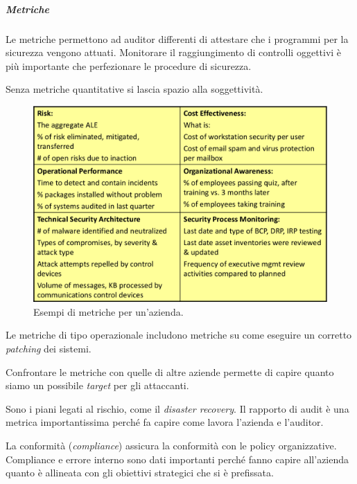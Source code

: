 \subparagraph{Metriche}

Le metriche permettono ad auditor differenti di attestare che i programmi per 
la sicurezza vengono attuati. Monitorare il raggiungimento di controlli oggettivi 
è più importante che perfezionare le procedure di sicurezza.

Senza metriche quantitative si lascia spazio alla soggettività.

\begin{figure}[h!]
        \begin{center}
                \includegraphics[scale=1.5]{res/img/metriche}
        \end{center}
        \caption{Esempi di metriche per un'azienda.}    
\end{figure}


Le metriche di tipo operazionale includono metriche su come eseguire 
un corretto \textit{patching} dei sistemi.

Confrontare le metriche con quelle di altre aziende permette di capire quanto 
siamo un possibile \textit{target} per gli attaccanti.


Sono i piani legati al rischio, come il \textit{disaster recovery}.
Il rapporto di audit è una metrica importantissima perché fa capire come lavora 
l'azienda e l'auditor.


La conformità (\textit{compliance}) assicura la conformità con le policy 
organizzative. Compliance e errore interno sono dati importanti perché 
fanno capire all'azienda quanto è allineata con gli obiettivi strategici che si 
è prefissata.



